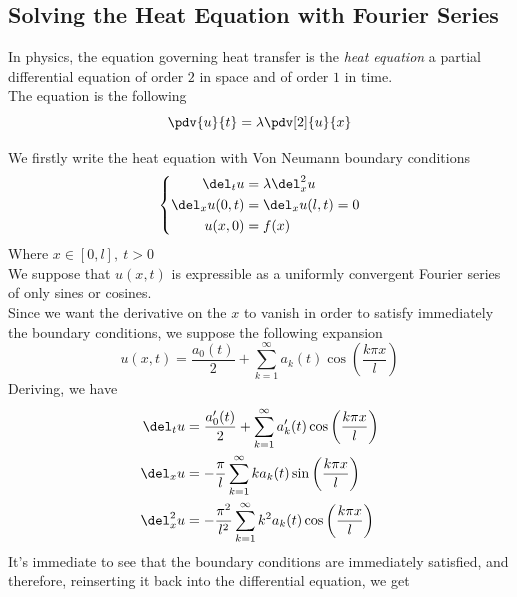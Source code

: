\documentclass[../mmf.tex]{subfiles}
\begin{document}
\subsection{Solving the Heat Equation with Fourier Series}
\begin{dfn}
	In physics, the equation governing heat transfer is the \textit{heat equation} a partial differential equation of order $2$ in space and of order $1$ in time.\\
	The equation is the following
	\begin{equation}
		\pdv{u}{t}=\lambda\pdv[2]{u}{x}
		\label{eq:heateq}
	\end{equation}
\end{dfn}
\begin{eg}
	We firstly write the heat equation with Von Neumann boundary conditions
	\begin{equation}
		\left\{ \begin{aligned}
				\del_tu&=\lambda\del^2_xu\\
				\del_xu(0,t)&=\del_xu(l,t)=0\\
				u(x,0)&=f(x)
		\end{aligned}\right.
		\label{eq:heateqvonneumann}
	\end{equation}
	Where $x\in[0,l],\ t>0$\\
	We suppose that $u(x,t)$ is expressible as a uniformly convergent Fourier series of only sines or cosines.\\
	Since we want the derivative on the $x$ to vanish in order to satisfy immediately the boundary conditions, we suppose the following expansion
	\begin{equation*}
		u(x,t)=\frac{a_0(t)}{2}+\sum_{k=1}^{\infty}a_k(t)\cos\left( \frac{k\pi x}{l} \right)
	\end{equation*}
	Deriving, we have
	\begin{equation*}
		\begin{aligned}
			\del_tu&=\frac{a_0'(t)}{2}+\sum_{k=1}^{\infty}a_k'(t)\cos\left( \frac{k\pi x}{l} \right)\\
			\del_xu&=-\frac{\pi}{l}\sum_{k=1}^\infty ka_k(t)\sin\left( \frac{k\pi x}{l} \right)\\
			\del^2_xu&=-\frac{\pi^2}{l^2}\sum_{k=1}^{\infty}k^2a_k(t)\cos\left( \frac{k\pi x}{l} \right)
		\end{aligned}
	\end{equation*}
	It's immediate to see that the boundary conditions are immediately satisfied, and therefore, reinserting it back into the differential equation, we get

\end{eg}
\end{document}
